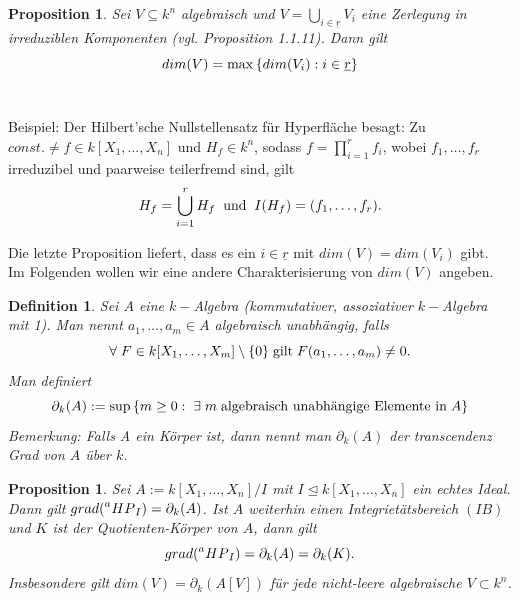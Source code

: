 \documentclass{article}
\newtheorem{definition}[satz]{Definition}
\newtheorem{proposition}[satz]{Proposition}
\newcommand*{\R}{k[X_{1},\ldots,X_{n}]}
\newcommand*{\indx}[2]{{#1}_{#2}}
\newcommand*{\hp}[1]{$\prescript{a}{}{HP}_{#1}$}
\begin{document}
\begin{proposition}
	Sei $V\subseteq k^n$ algebraisch und $V=\bigcup\limits_{i\in\underline{r}}\indx{V}{i}$ eine Zerlegung in irreduziblen Komponenten (vgl. Proposition 1.1.11). Dann gilt
	\begin{displaymath}
	dim(V)=\max{\{dim(\indx{V}{i}):i\in\underline{r}\}}\\
	\end{displaymath}
	\\
\end{proposition}
Beispiel:
Der Hilbert'sche Nullstellensatz für Hyperfläche besagt: Zu $const.\neq f\in \R$ und $\indx{H}{f}\in k^n$, sodass $f=\prod\limits_{i=1}^{r} \indx{f}{i}$, wobei $\indx{f}{1},\ldots,\indx{f}{r}$ irreduzibel und paarweise teilerfremd sind, gilt
\begin{displaymath}
\indx{H}{f}=\bigcup\limits_{i=1}^{r} \indx{H}{f}\;\; \textnormal{und}\;\;I(\indx{H}{f})=(\indx{f}{1},\ldots,\indx{f}{r}).
\end{displaymath}

Die letzte Proposition liefert, dass es ein $i\in \underline{r}$ mit $dim(V)=dim(\indx{V}{i})$ gibt.\\ 

Im Folgenden wollen wir eine andere Charakterisierung von $dim(V)$ angeben. 
\begin{definition}
	Sei $A$ eine $k-$Algebra (kommutativer, assoziativer $k-$Algebra mit 1). Man nennt $\indx{a}{1},\ldots,\indx{a}{m}\in A$ algebraisch unabhängig, falls 
	\begin{displaymath}
	\forall \;F\in k[\indx{X}{1},\ldots,\indx{X}{m}]\setminus\{0\} \;\textnormal{gilt}\; F(\indx{a}{1},\ldots,\indx{a}{m})\neq0.
	\end{displaymath}
	Man definiert
	\begin{displaymath}
	\indx{\partial}{k}(A):=\sup{\{m\geq0:\;\exists\; m \;\textnormal{algebraisch unabhängige Elemente in}\; A\}}
	\end{displaymath}
	Bemerkung: Falls A ein Körper ist, dann nennt man $\indx{\partial}{k}(A)$ der transcendenz Grad von $A$ über $k$.\\
\end{definition}


\begin{proposition}
	Sei $A:=\R/I$ mit $I\unlhd\R$ ein echtes Ideal. Dann gilt $grad(\textnormal{\hp{I}})=\indx{\partial}{k}(A)$. Ist $A$ weiterhin einen Integrietätsbereich $(IB)$ und $K$ ist der Quotienten-Körper von $A$, dann gilt
	\begin{displaymath}
	grad(\textnormal{\hp{I}})=\indx{\partial}{k}(A)=\indx{\partial}{k}(K).
	\end{displaymath}
	Insbesondere gilt $dim(V)=\indx{\partial}{k}(A[V])$ für jede nicht-leere algebraische $V\subset k^n$.\\
\end{proposition}
\end{document}
